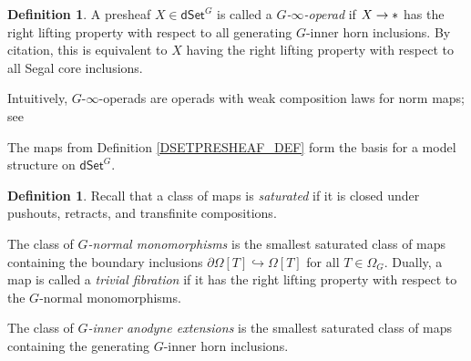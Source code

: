 \documentclass[a4paper,10pt
,draft
]{article}%
\numberwithin{equation}{section}
\numberwithin{figure}{section}
\theoremstyle{definition} %
\newtheorem{definition}[equation]{Definition}%
\newtheorem{example}[equation]{Example}%
\newtheorem{notation}[equation]{Notation}%
\newcommand{\into}{\hookrightarrow}%
\newcommand{\dSet}{\mathsf{dSet}}
\DeclareMathOperator{\Hom}{Hom}%
\newcommand{\1}{\ensuremath{\mathbbm 1}}%
\begin{document}

\begin{definition}
      A presheaf $X \in \dSet^G$ is called a \textit{$G$-$\infty$-operad} if $X \to \**$ has the right lifting property with respect to all generating $G$-inner horn inclusions.
      By {\color{blue} citation}, this is equivalent to $X$ having the right lifting property with respect to all Segal core inclusions.
\end{definition}
Intuitively,
$G$-$\infty$-operads are operads with weak composition laws for norm maps;
see





The maps from Definition \ref{DSETPRESHEAF_DEF} form the basis for a model structure on $\dSet^G$.

\begin{definition}
      Recall that a class of maps is \textit{saturated} if it is closed under pushouts, retracts, and transfinite compositions.
      
      The class of \textit{$G$-normal monomorphisms}
      is the smallest saturated class of maps containing the boundary inclusions $\partial \Omega[T] \into \Omega[T]$ for all $T \in \Omega_G$.
      Dually, a map is called a \textit{trivial fibration} if it has the right lifting property with respect to the $G$-normal monomorphisms.
      
      The class of \textit{$G$-inner anodyne extensions} is the smallest saturated class of maps containing the generating $G$-inner horn inclusions.
\end{definition}
\end{document}
